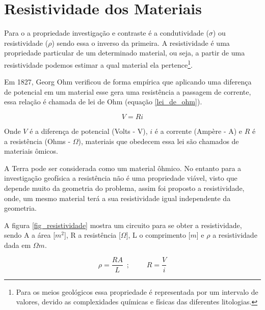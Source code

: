     \section{Resistividade dos Materiais}
    
    Para o \MT a propriedade investigação e contraste é a condutividade ($\sigma$) ou resistividade ($\rho$) sendo essa o inverso da primeira.
    A resistividade é uma propriedade particular de um determinado material, ou seja, a partir de uma resistividade podemos estimar a qual material ela pertence\footnote{Para os meios geológicos essa propriedade é representada por um intervalo de valores, devido as complexidades químicas e físicas das diferentes litologias.}.
    
    Em 1827, Georg Ohm verificou de forma empírica que aplicando uma diferença de potencial em um material esse gera uma resistência a passagem de corrente, essa relação é chamada de lei de Ohm (equação \ref{lei_de_ohm})\cite{eletromag8hayt}.
    
    \begin{equation}
        \label{lei_de_ohm}
        V = R i
    \end{equation}
    
    Onde $V$ é a diferença de potencial (Volts - V), $i$ é a corrente (Ampère - A) e $R$ é a resistência (Ohms - $\Omega$), materiais que obedecem essa lei são chamados de materiais ômicos.
    
    A Terra pode ser considerada como um material ôhmico. No entanto para a investigação geofísica a resistência não é uma propriedade viável, visto  que depende muito da geometria do problema, assim foi proposto a resistividade, onde, um mesmo material terá a sua resistividade igual independente da geometria.
    
    A figura \ref{fig_resistividade} mostra um circuito para se obter a resistividade, sendo A a área [$m^2$], R a resistência [$\Omega$], L o comprimento [$m$] e $\rho$ a resistividade dada em $\Omega m$. 
    
    \begin{equation}
        \label{resistividade}
        \rho = \dfrac{R A}{L}\, \, \, ;\, \, \, \, \, \, \, \, \, \, \, \, \, \,  R = \dfrac{V}{i}
    \end{equation}
    
